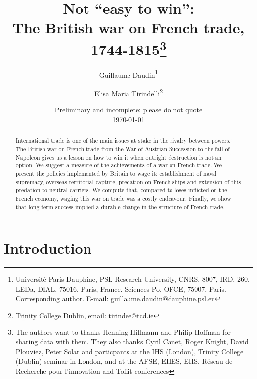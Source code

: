 \documentclass[12pt,a4paper,notitlepage,english]{article}
\author{
  Guillaume Daudin\thanks{Université Paris-Dauphine, PSL Research University, CNRS, 8007, IRD, 260, LEDa, DIAL, 75016, Paris, France. Sciences Po, OFCE, 75007, Paris. Corresponding author. E-mail: guillaume.daudin@dauphine.psl.eu}
  \and
  Elisa Maria Tirindelli\thanks{Trinity College Dublin, email: tirindee@tcd.ie}
}
\title{Not “easy to win”: \\ The British war on French trade, 1744-1815\thanks{The authors want to thanks Henning Hillmann and Philip Hoffman for sharing data with them. They also thanks Cyril Canet, Roger Knight, David Plouviez, Peter Solar and particpants at the IHS (London), Trinity College (Dublin) seminar in London, and at the AFSE, EHES, EHS, Réseau de Recherche pour l’innovation and Toflit conferences}}
\date{Preliminary and incomplete: please do not quote \\  \today}
\begin{document}
\maketitle


\begin{abstract}
International trade is one of the main issues at stake in the rivalry between powers. The
British war on French trade from the War of Austrian Succession to the fall of Napoleon gives
us a lesson on how to win it when outright destruction is not an option. We suggest a measure
of the achievements of a war on French trade. We present the policies implemented by Britain
to wage it: establishment of naval supremacy, overseas territorial capture, predation on French
ships and extension of this predation to neutral carriers.
We compute that, compared to loses inflicted on the French economy, waging this war on trade was a costly endeavour.
Finally, we show that long term success implied a durable change in the structure of French trade.
\end{abstract}




\section{Introduction} \label{introduction}


\maketitle

%
\end{document}
